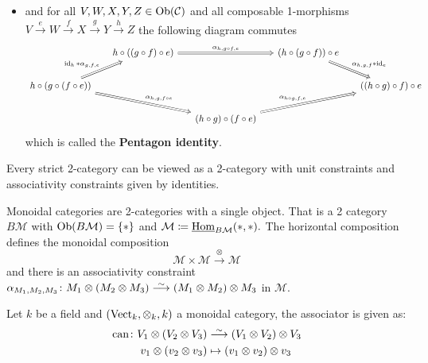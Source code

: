 \begin{defi}
\begin{itemize}
		\item 
		and for all $ V , W ,X ,Y ,Z \in \operatorname{Ob} ( \mathcal{ C } )$ and all composable 1-morphisms $ V \xrightarrow{e} W \xrightarrow{f} X \xrightarrow{ g } Y \xrightarrow{ h } Z $
		the following diagram commutes
		\[
		\begin{tikzcd}[column sep=0.5cm]
			& h \circ ( ( g \circ f ) \circ e )
			\ar[rr, Rightarrow, " \alpha_{ h , g \circ f , e }"]
			&&
			( h \circ ( g \circ f ) ) \circ e 
			\ar[rd, Rightarrow, " \alpha_{ h , g , f } * \id_e"]
			\\
			h \circ ( g \circ ( f \circ e ))
			\ar[ru, Rightarrow, "\id_{h} * \alpha_{g , f , e}"]
			\ar[rrd, Rightarrow," \alpha_{ h , g , f \circ e }"]
			&&&&
			(( h \circ g ) \circ f ) \circ e
			\\
			&&
			( h \circ g ) \circ ( f \circ e )
			\ar[rru, Rightarrow, " \alpha_{ h \circ g , f , e }"]
		\end{tikzcd}
		\]
		which is called the \textbf{Pentagon identity}.
	\end{itemize}
\end{defi}


\begin{exmp}
	Every strict 2-category can be viewed as a 2-category with unit constraints and associativity constraints given by identities.
\end{exmp}

\begin{defi}
	Monoidal categories are 2-categories with a single object.
	That is a 2 category
	$ B \mathcal{ M }$ with $ \operatorname{Ob} ( B \mathcal{ M } ) = \{ * \} $ and $ \mathcal{ M } \coloneqq \operatorname{\underline{Hom}}_{B \mathcal{ M} } ( * , * ).$
	The horizontal composition defines the monoidal composition
	\[
		\mathcal{ M } \times \mathcal{ M }
		\xrightarrow{ \otimes }
		\mathcal{M}
	\]
	and there is an associativity constraint $ \alpha_{M_1 , M_2 , M_3 } \colon M_1 \otimes ( M_2 \otimes M_3 ) \isomorphism ( M_1 \otimes M_2 ) \otimes M_3$ in $\mathcal{ M }$.
\end{defi}

\begin{exmp}
	Let $ k $ be a field and $ ( \operatorname{Vect}_k , \otimes_k , k ) $ a monoidal category, the associator is given as:
	\begin{align*}
		\can \colon V_1 \otimes ( V_2 \otimes V_3 ) 
		&\isomorphism 
		( V_1 \otimes V_2 ) \otimes V_3
		\\
		v_1 \otimes ( v_2 \otimes v_3 )
		&\mapsto
		(v_1 \otimes v_2) \otimes v_3
	\end{align*}
\end{exmp}

